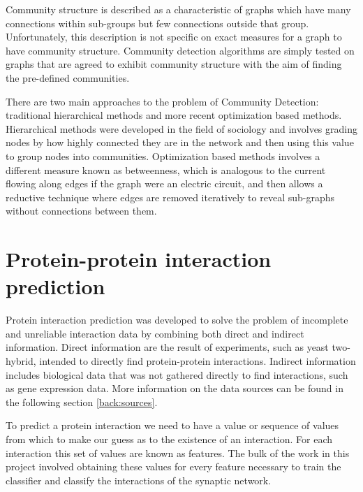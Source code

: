 Community structure is described as a characteristic of graphs which have many connections within sub-groups but few connections outside that group\autocite{newman_communities_2012}.
Unfortunately, this description is not specific on exact measures for a graph to have community structure.
Community detection algorithms are simply tested on graphs that are agreed to exhibit community structure with the aim of finding the pre-defined communities.

There are two main approaches to the problem of Community Detection: traditional hierarchical methods and more recent optimization based methods\autocite{newman_communities_2012}.
Hierarchical methods were developed in the field of sociology and involves grading nodes by how highly connected they are in the network and then using this value to group nodes into communities.
Optimization based methods involves a different measure known as betweenness, which is analogous to the current flowing along edges if the graph were an electric circuit, and then allows a reductive technique where edges are removed iteratively to reveal sub-graphs without connections between them.



\section{Protein-protein interaction prediction}

Protein interaction prediction was developed to solve the problem of incomplete and unreliable interaction data by combining both direct and indirect information\autocite{qi_learning_2008}.
Direct information are the result of experiments, such as yeast two-hybrid, intended to directly find protein-protein interactions.
Indirect information includes biological data that was not gathered directly to find interactions, such as gene expression data.
More information on the data sources can be found in the following section \ref{back:sources}.

To predict a protein interaction we need to have a value or sequence of values from which to make our guess as to the existence of an interaction.
For each interaction this set of values are known as features.
The bulk of the work in this project involved obtaining these values for every feature necessary to train the classifier and classify the interactions of the synaptic network.

